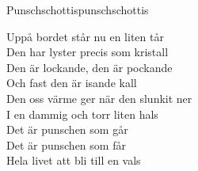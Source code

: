 \begin{song}{Punschschottis}{punschschottis}
\begin{vers}
Uppå bordet står nu en liten tår\\
Den har lyster precis som kristall\\
Den är lockande, den är pockande\\
Och fast den är isande kall\\
Den oss värme ger när den slunkit ner\\
I en dammig och torr liten hals\\
Det är punschen som går\\
Det är punschen som får\\
Hela livet att bli till en vals\\
\end{vers}
\end{song}
